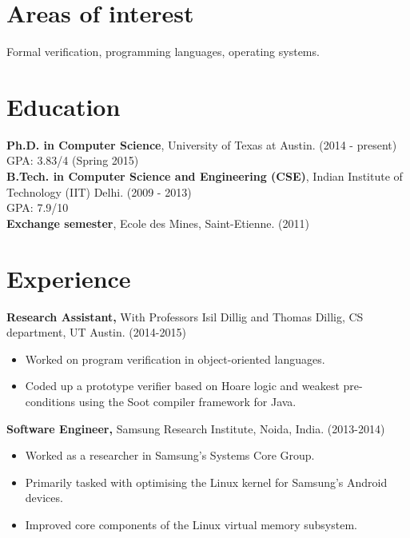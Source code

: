 \documentclass[margin]{res}
\begin{document}
 
 
 
\address{Department of Computer Science \\University of Texas at Austin \\ Austin, TX 78712  \\
        +1 512-952-0104 \\ mihir@cs.utexas.edu }

 
\begin{resume} 
 
\section{Areas of interest} 
Formal verification, programming languages, operating systems.

\section{Education} 
{\bf Ph.D. in Computer Science}, University of Texas at Austin. \hfill (2014 - present)\\
GPA: 3.83/4 \hfill (Spring 2015)\\
{\bf B.Tech. in Computer Science and Engineering (CSE)}, Indian Institute of
Technology (IIT) Delhi. \hfill (2009 - 2013)\\
GPA: 7.9/10\\
{\bf Exchange semester}, Ecole des Mines, Saint-Etienne. \hfill (2011)

\section{Experience}

 {\bf Research Assistant,} With Professors Isil Dillig and Thomas
 Dillig, CS department, UT Austin. \hfill (2014-2015)
 \begin{itemize} \itemsep -2pt  %
 \item Worked on program verification in object-oriented languages.
 \item Coded up a prototype verifier based on Hoare logic and weakest
   pre-conditions using the Soot compiler framework for Java.
 \end{itemize}
 
 {\bf Software Engineer,} Samsung Research Institute, Noida, India. \hfill (2013-2014)
 \begin{itemize} \itemsep -2pt  %
 \item Worked as a researcher in Samsung's Systems Core Group.
 \item Primarily tasked with optimising the Linux kernel for Samsung's
   Android devices.
 \item Improved core components of the Linux virtual memory subsystem.
 \end{itemize}


\end{resume}
\end{document}

